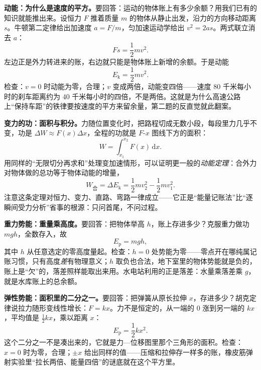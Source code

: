 \textbf{动能：为什么是速度的平方。}要回答：运动的物体账上有多少余额？用我们已有的知识就能推出来。设恒力 \(F\) 推着质量 \(m\) 的物体从静止出发，沿力的方向移动距离 \(s\)。牛顿第二定律给出加速度 \(a=F/m\)，匀加速运动学给出 \(v^2=2as\)。两式联立消去 \(a\)：
\[
Fs=\frac{1}{2}mv^2 .
\]
左边正是外力转进来的账，右边就只能是物体账上新增的余额。于是动能
\[
E_{\mathrm k}=\frac{1}{2}mv^2 .
\]
检查：\(v=0\) 时动能为零，合理；\(v\) 变成两倍，动能变四倍——速度 \(80\) 千米每小时的刹车距离约为 \(40\) 千米每小时的四倍，不是两倍。这就是为什么高速公路上“保持车距”的铁律要按速度的平方来留余量，第二题的反直觉就此翻案。

\begin{mathbridge}
\textbf{变力的功：面积与积分。}力随位置变化时，把路程切成无数小段，每段里力几乎不变，功是 \(\Delta W\approx F(x)\Delta x\)，全程的功就是 \(F\)-\(x\) 图线下方的面积：
\[
W=\int_{x_1}^{x_2}F(x)\,\mathrm dx .
\]
用同样的“无限切分再求和”处理变加速情形，可以证明更一般的\emph{动能定理}：合外力对物体做的总功等于物体动能的增量，
\[
W_{\text{合}}=\Delta E_{\mathrm k}=\frac{1}{2}mv_2^2-\frac{1}{2}mv_1^2 .
\]
注意这条定理对恒力、变力、直路、弯路一律成立——它正是“能量记账法”比“逐瞬间受力分析”省事的根源：只问首尾，不问过程。
\end{mathbridge}

\textbf{重力势能：重量乘高度。}要回答：把物体举高 \(h\)，账上存进多少？克服重力做功 \(mgh\)，全数存入，故
\[
E_{\mathrm p}=mgh ,
\]
其中 \(h\) 从任意选定的零高度量起。检查：\(h=0\) 处势能为零——零点开在哪纯属记账习惯，只有高度\emph{差}有物理意义；\(h\) 取负也合法，地下室里的物体势能就是负的，账上是“欠”的，落差照样能取出来用。水电站利用的正是落差：水量乘落差乘 \(g\)，就是水库账上的总余额。

\textbf{弹性势能：面积里的二分之一。}要回答：把弹簧从原长拉伸 \(x\)，存进多少？胡克定律说拉力随形变线性增长：\(F=kx\)。力不是恒定的，从一端的 \(0\) 涨到另一端的 \(kx\)，平均值是 \(\frac{1}{2}kx\)，乘以距离 \(x\)：
\[
E_{\mathrm p}=\frac{1}{2}kx^2 .
\]
这个二分之一不是凑出来的，它就是力—位移图里那个三角形的面积。检查：\(x=0\) 时为零，合理；\(\pm x\) 给出同样的值——压缩和拉伸存一样多的账，橡皮筋弹射实验里“拉长两倍、能量四倍”的谜底就在这个平方里。

\begin{center}
\end{center}

